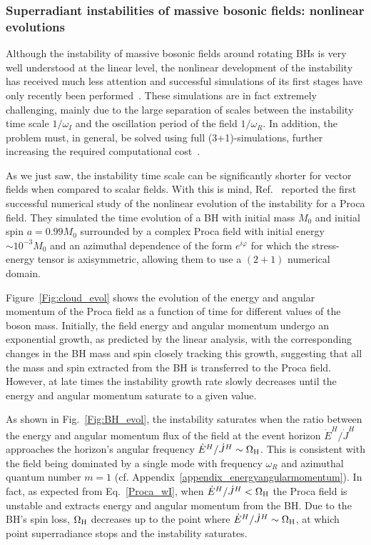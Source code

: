 \documentclass[11pt]{article}
\numberwithin{equation}{section} %
\begin{document}
\subsubsection{Superradiant instabilities of massive bosonic fields: nonlinear evolutions} 
\label{sec:nonlinear}
Although the instability of massive bosonic fields around rotating BHs is very well understood at the linear level, the 
nonlinear development of the instability has received much less attention and successful simulations of its first stages 
have only recently been performed~\cite{East:2017ovw,East:2018glu}. These simulations are in fact extremely challenging, 
mainly due to the large separation of scales between the instability time scale $1/\omega_I$ and the oscillation period 
of the field $1/\omega_R$. In addition, the problem must, in general, be solved using full (3+1)-simulations, 
further increasing the required computational 
cost~\cite{Okawa:2014nda,Zilhao:2015tya,East:2017ovw,East:2018glu}.

As we just saw, the instability time scale can be significantly shorter for vector fields when compared to scalar fields. With this is mind, Ref.~\cite{East:2017ovw} reported the first successful numerical study of the nonlinear evolution of the instability for a Proca field. They simulated the time evolution of a BH with initial mass $M_0$ and initial spin $a=0.99 M_0$  surrounded by a complex Proca field with initial energy $\sim 10^{-3} M_0$ and an azimuthal dependence of the form $e^{i \varphi}$ for which the stress-energy tensor is axisymmetric, allowing them to use a $(2+1)$ numerical domain.

Figure~\ref{Fig:cloud_evol} shows the evolution of the energy and angular momentum of the Proca field as a function of time for different values of the boson mass. Initially, the field energy and angular momentum undergo an exponential growth, as predicted by the linear analysis, with the corresponding changes in the BH mass and spin closely tracking this growth, suggesting that all the mass and spin extracted from the BH is transferred to the Proca field. However, at late times the instability growth rate slowly decreases until the energy and angular momentum saturate to a given value. 

As shown in Fig.~\ref{Fig:BH_evol}, the instability saturates when the ratio between the energy and angular momentum flux of the field at the event horizon $\dot{E}^H/\dot{J}^H$ approaches the horizon's angular frequency $\dot{E}^H/\dot{J}^H\sim \Omega_{\rm H}$. This is consistent with the field being dominated by a single mode with frequency $\omega_R$ and azimuthal quantum number $m=1$ (cf. Appendix~\ref{appendix_energyangularmomentum}). In fact, as expected from Eq.~\eqref{Proca_wI}, when $\dot{E}^H/\dot{J}^H< \Omega_{\rm H}$ the Proca field is unstable and extracts energy and angular momentum from the BH. Due to the BH's spin loss, $\Omega_{\rm H}$ decreases up to the point where $\dot{E}^H/\dot{J}^H\sim \Omega_{\rm H}$, at which point superradiance stops and the instability saturates. 
\end{document}
